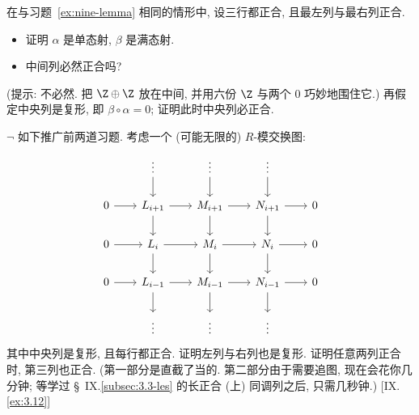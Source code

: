 \begin{prob}
\label{ex:nine-lemma-2}
在与习题~\ref{ex:nine-lemma} 相同的情形中, 设三行都正合, 且最左列与最右列正合.
\begin{itemize}
	\item 证明 $\alpha$ 是单态射, $\beta$ 是满态射.
	\item 中间列必然正合吗?
\end{itemize}
(提示: 不必然. 把 $\Z \oplus \Z$ 放在中间, 并用六份 $\Z$ 与两个 $0$ 巧妙地围住它.)
再假定中央列是复形, 即 $\beta\circ\alpha=0$; 证明此时中央列必正合.
\end{prob}

\begin{prob}
\label{ex:infinite-nine-lemma}
$\neg$ 如下推广前两道习题. 考虑一个 (可能无限的) $R$-模交换图:
\[
\begin{tikzcd}[row sep=1.8em,column sep=2em]
&\vdots \ar[d] &\vdots \ar[d] &\vdots \ar[d] & \\
0 \ar[r] &L_{i+1} \ar[r] \ar[d] &M_{i+1} \ar[r] \ar[d] &N_{i+1} \ar[r] \ar[d] &0 \\
0 \ar[r] &L_i \ar[r] \ar[d] &M_i \ar[r] \ar[d] &N_i \ar[r] \ar[d] &0 \\
0 \ar[r] &L_{i-1} \ar[r] \ar[d] &M_{i-1} \ar[r] \ar[d] &N_{i-1} \ar[r] \ar[d] &0 \\
&\vdots &\vdots &\vdots &
\end{tikzcd}
\]
其中中央列是复形, 且每行都正合. 证明左列与右列也是复形. 证明任意两列正合时, 第三列也正合. (第一部分是直截了当的. 第二部分由于需要追图, 现在会花你几分钟; 等学过 \S~IX.\ref{subsec:3.3-les} 的长正合 (上) 同调列之后, 只需几秒钟.) [IX.\ref{ex:3.12}]
\end{prob}
